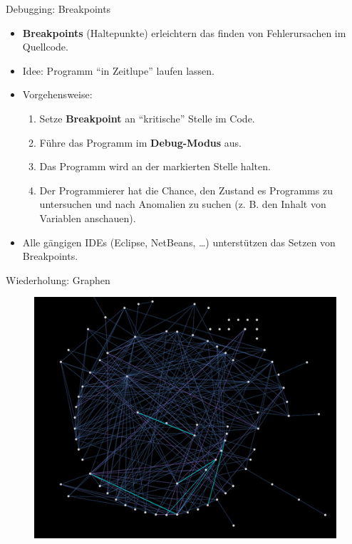 \documentclass[18pt]{beamer}
\newcommand{\quotes}[1]{``#1''}
\begin{document}
\begin{frame}{Debugging: Breakpoints}
    \begin{itemize}
        \item \textbf{Breakpoints} (Haltepunkte) erleichtern das finden von Fehlerursachen im Quellcode.
        \item Idee: Programm \quotes{in Zeitlupe} laufen lassen.
        \item Vorgehensweise:
        \begin{enumerate}
            \item Setze \textbf{Breakpoint} an \quotes{kritische} Stelle im Code.
            \item Führe das Programm im \textbf{Debug-Modus} aus.
            \item Das Programm wird an der markierten Stelle \alert{halten}.
            \item Der Programmierer hat die Chance, den Zustand es Programms zu untersuchen und nach Anomalien zu suchen (z. B. den Inhalt von Variablen anschauen).
        \end{enumerate}
        \item Alle gängigen IDEs (Eclipse, NetBeans, \dots) unterstützen das Setzen von Breakpoints.
    \end{itemize}
\end{frame}

\appendix
\beginbackup

\begin{frame}{Wiederholung: Graphen}
    \begin{figure}
        \includegraphics[scale=.4]{img/graph_4fj49f4.jpg}
    \end{figure}
\end{frame}
\end{document}
